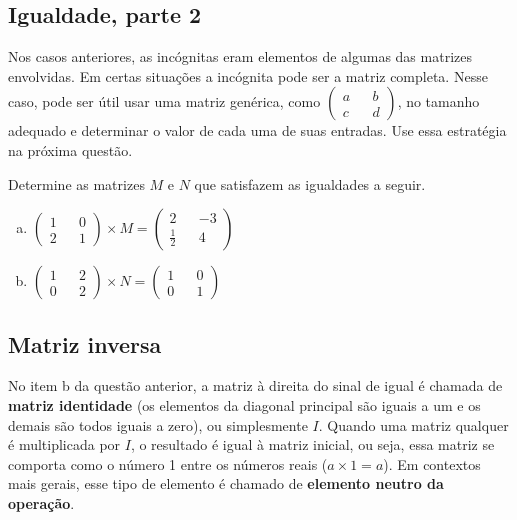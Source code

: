 \documentclass[main_estudante.tex]{subfiles}
\begin{document}
\subsection*{Igualdade, parte 2}

Nos casos anteriores, as incógnitas eram elementos de algumas das matrizes envolvidas. Em certas situações a incógnita pode ser a matriz completa. Nesse caso, pode ser útil usar uma matriz genérica, como $\begin{pmatrix} a && b \\ c && d \end{pmatrix}$, no tamanho adequado e determinar o valor de cada uma de suas entradas. Use essa estratégia na próxima questão.

\begin{questao}
Determine as matrizes $M$ e $N$ que satisfazem as igualdades a seguir.
\begin{enumerate}[a)]
\item $ \begin{pmatrix} 1 && 0 \\ 2 && 1 \end{pmatrix} \times M = \begin{pmatrix} 2 && -3 \\ \frac{1}{2} && 4 \end{pmatrix} $
\item $ \begin{pmatrix} 1 && 2 \\ 0 && 2 \end{pmatrix} \times N = \begin{pmatrix} 1 && 0 \\ 0 && 1 \end{pmatrix} $ 
\end{enumerate}
\end{questao}

\subsection*{Matriz inversa}

No item b da questão anterior, a matriz à direita do sinal de igual é chamada de \textbf{matriz identidade} (os elementos da diagonal principal são iguais a um e os demais são todos iguais a zero), ou simplesmente $I$. Quando uma matriz qualquer é multiplicada por $I$, o resultado é igual à matriz inicial, ou seja, essa matriz se comporta como o número 1 entre os números reais ($a \times 1 = a$). Em contextos mais gerais, esse tipo de elemento é chamado de \textbf{elemento neutro da operação}.
\end{document}
